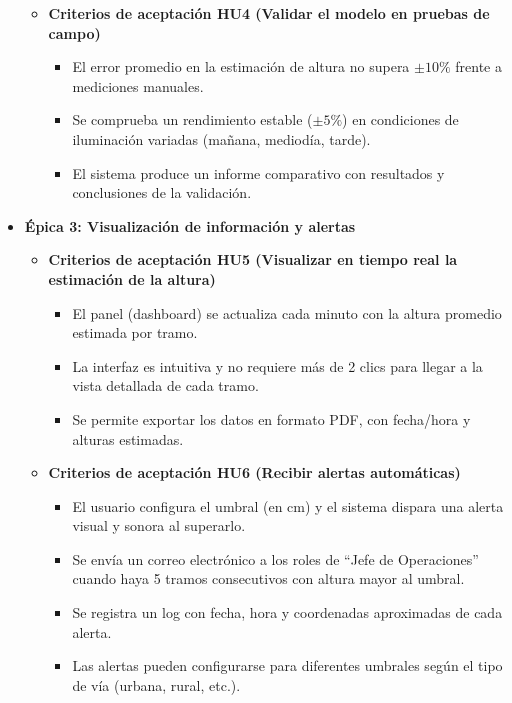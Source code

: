 \documentclass[
11pt, %
]{ProyectoVpC}
\begin{document}
\begin{itemize}
\begin{itemize}
      \item \textbf{Criterios de aceptación HU4 (Validar el modelo en pruebas de campo)}
        \begin{itemize}
          \item El error promedio en la estimación de altura no supera $\pm10\%$ frente a mediciones manuales.
          \item Se comprueba un rendimiento estable ($\pm5\%$) en condiciones de iluminación variadas (mañana, mediodía, tarde).
          \item El sistema produce un informe comparativo con resultados y conclusiones de la validación.
        \end{itemize}
    \end{itemize}

  \item \textbf{\'{E}pica 3: Visualización de información y alertas}
    \begin{itemize}
      \item \textbf{Criterios de aceptación HU5 (Visualizar en tiempo real la estimación de la altura)}
        \begin{itemize}
          \item El panel (dashboard) se actualiza cada minuto con la altura promedio estimada por tramo.
          \item La interfaz es intuitiva y no requiere más de 2 clics para llegar a la vista detallada de cada tramo.
          \item Se permite exportar los datos en formato PDF, con fecha/hora y alturas estimadas.
        \end{itemize}

      \item \textbf{Criterios de aceptación HU6 (Recibir alertas automáticas)}
        \begin{itemize}
          \item El usuario configura el umbral (en cm) y el sistema dispara una alerta visual y sonora al superarlo.
          \item Se envía un correo electrónico a los roles de “Jefe de Operaciones” cuando haya 5 tramos consecutivos con altura mayor al umbral.
          \item Se registra un log con fecha, hora y coordenadas aproximadas de cada alerta.
          \item Las alertas pueden configurarse para diferentes umbrales según el tipo de vía (urbana, rural, etc.).
        \end{itemize}
    \end{itemize}


\end{itemize}
\end{document}
